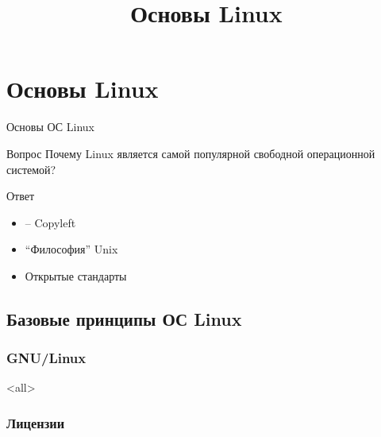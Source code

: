 

\newcommand{\defaultuser}{cur\_user}

\title{Основы Linux}


\maketitle

\tableofcontents

\chapter{Основы Linux}

\begin{frame}{Основы ОС Linux}

	\begin{block}{Вопрос}
	Почему Linux является самой популярной
	свободной операционной системой?
	\end{block}

	\pause

	\begin{block}{Ответ}
	\begin{itemize}
		\item \textcopyleft -- Copyleft
		\item ``Философия'' Unix
		\item Открытые стандарты
	\end{itemize}
	\end{block}

\end{frame}



\section[Принципы]{Базовые принципы ОС Linux}

\subsection{GNU/Linux}

\mode<all>{}

\subsection{Лицензии}

